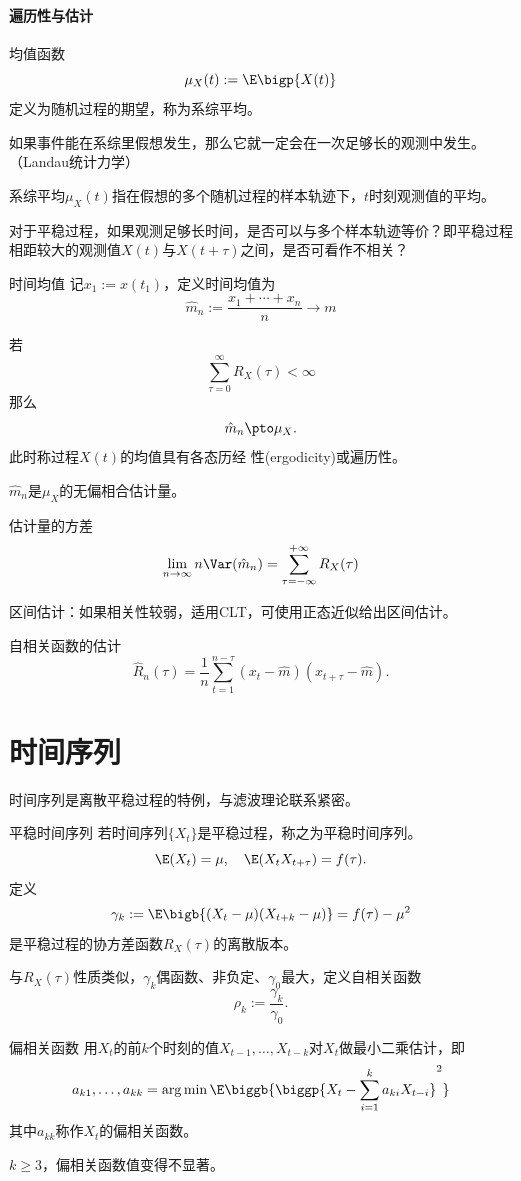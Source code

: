 \paragraph{遍历性与估计}
均值函数
\[
	\mu_X(t):=\E\bigp{X(t)}
\]
定义为随机过程的期望，称为系综平均。
\begin{compactitem}
	\item 如果事件能在系综里假想发生，那么它就一定会在一次足够长的观测中发生。（Landau统计力学）
	\item 系综平均$\mu_X(t)$指在假想的多个随机过程的样本轨迹下，$t $时刻观测值的平均。
	\item 对于平稳过程，如果观测足够长时间，是否可以与多个样本轨迹等价？即平稳过程相距较大的观测值$ X(t) $与$ X(t + \tau) $之间，是否可看作不相关？
\end{compactitem}
\begin{definition}{时间均值}{}
	记$x_1:=x(t_1)$，定义时间均值为
	\[
		\hat m_n:=\frac{x_1+\cdots+x_n}n\to m
	\]
\end{definition}
若
\[
	\sum_{\tau=0}^\infty R_X(\tau)<\infty
\]
那么
\[
	\hat m_n\pto\mu_X.
\]
此时称过程$ X(t) $的均值具有各态历经
性(ergodicity)或遍历性。
\begin{compactitem}
	\item $\hat m_n$是$\mu_X$的无偏相合估计量。
	\item 估计量的方差\[
		\lim_{n\to\infty}n\Var(\hat m_n)=\sum_{\tau=-\infty}^{+\infty}R_X(\tau)
	\]
\end{compactitem}
区间估计：如果相关性较弱，适用CLT，可使用正态近似给出区间估计。

自相关函数的估计
\[
	\hat R_n(\tau)=\frac1n\sum_{t=1}^{n-\tau}(x_t-\hat m)(x_{t+\tau}-\hat m).
\]
\section{时间序列}
时间序列是离散平稳过程的特例，与滤波理论联系紧密。
\begin{definition}{平稳时间序列}{}
	若时间序列$\{X_t\}$是平稳过程，称之为平稳时间序列。
	\[
		\E(X_t)=\mu,\quad\E(X_tX_{t+\tau})=f(\tau).
	\]
	定义
	\[
		\gamma_k:=\E\bigb{(X_t-\mu)(X_{t+k}-\mu)}=f(\tau)-\mu^2
	\]
	是平稳过程的协方差函数$R_X(\tau)$的离散版本。
\end{definition}
与$R_X(\tau)$性质类似，$\gamma_k$偶函数、非负定、$\gamma_0$最大，定义自相关函数
\[
	\rho_k:=\frac{\gamma_k}{\gamma_0}.
\]
\begin{definition}{偏相关函数}{}
	用$X_t$的前$ k $个时刻的值$X_{t-1},\ldots,X_{t-k}$对$ X_t $做最小二乘估计，即
	\[
		a_{k1},\ldots,a_{kk}=\arg\min\E\biggb{\biggp{X_t-\sum_{i=1}^ka_{ki}X_{t-i}}^2}
	\]
	其中$a_{kk}$称作$X_t$的偏相关函数。
\end{definition}
$k\geqslant 3$，偏相关函数值变得不显著。
